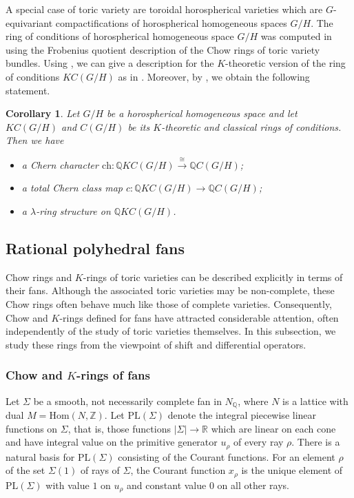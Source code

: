 \documentclass[oneside]{amsart}
\theoremstyle{plain}
\newtheorem{corollary}[theorem]{Corollary}
\theoremstyle{definition}
\newcommand{\R}{{\mathbb{R}}}
\newcommand{\Z}{{\mathbb{Z}}}
\newcommand{\Q}{{\mathbb{Q}}}
\newcommand{\Hom}{{\mathrm{Hom}}}
\newcommand{\ch}{{\mathrm{ch}}}
\newcommand{\PL}{{\mathrm{PL}}}
\begin{document}
A special case of toric variety are toroidal horospherical varieties which are $G$-equivariant compactifications of horospherical homogeneous spaces $G/H$. The  ring of conditions of horospherical homogeneous space $G/H$ was computed in \cite{khovanskii2021gorenstein}  using the Frobenius quotient description of the Chow rings of toric variety bundles. Using , we can give a description for the $K$-theoretic version of the ring of conditions $KC(G/H)$ as in . Moreover, by , we obtain the following statement.
\begin{corollary}\label{cor:conditions-ring-horospherical}
Let $G/H$ be a horospherical homogeneous space and let $KC(G/H)$ and $C(G/H)$ be its $K$-theoretic and classical rings of conditions. Then we have
 \begin{itemize}
      \item a Chern character $\ch: \Q KC(G/H) \xrightarrow{\cong} \Q C(G/H)$;
      \item a total Chern class map $c: \Q KC(G/H) \to \Q C(G/H)$;
      \item a $\lambda$-ring structure on $\Q KC(G/H)$.
  \end{itemize}
\end{corollary}


\subsection{Rational polyhedral fans}

Chow rings and $K$-rings of toric varieties can be described explicitly in terms of their fans. Although the associated toric varieties may be non-complete, these Chow rings often behave much like those of complete varieties. Consequently, Chow and $K$-rings defined for fans have attracted considerable attention, often independently of the study of toric varieties themselves. In this subsection, we study these rings from the viewpoint of shift and differential operators.

\subsubsection{Chow and $K$-rings of fans}
Let $\Sigma$ be a smooth, not necessarily complete fan in $N_\Q$, where $N$ is a lattice with dual $M=\Hom(N,\Z)$. Let $\PL(\Sigma)$ denote the integral piecewise linear functions on $\Sigma$, that is, those functions $\vert\Sigma\vert\to \R$ which are linear on each cone and have integral value on the primitive generator $u_\rho$ of every ray $\rho$. There is a natural basis for $\PL(\Sigma)$ consisting of the Courant functions. For an element $\rho$ of the set $\Sigma(1)$ of rays of $\Sigma$, the Courant function $x_\rho$ is the unique element of $\PL(\Sigma)$ with value $1$ on $u_\rho$ and constant value $0$ on all other rays. 
\end{document}
